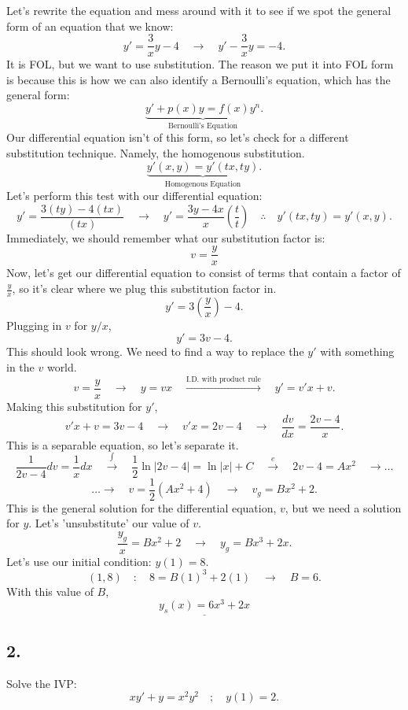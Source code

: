 \documentclass[a4paper,12pt]{article}
\begin{document}
Let's rewrite the equation and mess around with it to see if we spot the general form of an equation that we know:
$$ y' = \frac{3}{x}y - 4 \quad\rightarrow\quad y' - \frac{3}{x}y = -4. $$
It is FOL, but we want to use substitution. The reason we put it into FOL form is because this is how we can also identify a Bernoulli's equation, which has the general form:
$$ \underbrace{y' + p(x)y = f(x)y^{n}}_{\text{Bernoulli's Equation}}. $$
Our differential equation isn't of this form, so let's check for a different substitution technique. Namely, the homogenous substitution.
$$ \underbrace{y'(x, y) = y'(tx, ty)}_{\text{Homogenous Equation}}. $$
Let's perform this test with our differential equation:
$$ y' = \frac{3(ty) - 4(tx)}{(tx)} \quad\rightarrow\quad y' = \frac{3y-4x}{x} \left(\frac{t}{t}\right) \quad\therefore\quad y'(tx, ty)=y'(x,y). $$
Immediately, we should remember what our substitution factor is:
$$ \boxed{v=\frac{y}{x}} $$
Now, let's get our differential equation to consist of terms that contain a factor of $\frac{y}{x}$, so it's clear where we plug this substitution factor in.
$$ y' = 3\left(\frac{y}{x}\right) - 4. $$
Plugging in $v$ for $y/x$,
$$ y' = 3v -4. $$
This should look wrong. We need to find a way to replace the $y'$ with something in the $v$ world.
$$ v=\frac{y}{x} \quad\rightarrow\quad y = vx \quad\overset{\text{I.D. with product rule}}\rightarrow\quad y' = v'x + v. $$
Making this substitution for $y'$,
$$ v'x + v = 3v - 4 \quad\rightarrow\quad v'x = 2v-4 \quad\rightarrow\quad \frac{dv}{dx} = \frac{2v-4}{x}. $$
This is a separable equation, so let's separate it.
$$ \frac{1}{2v-4}dv = \frac{1}{x}dx \quad\overset{\int}\rightarrow\quad \frac{1}{2}\ln{|2v-4|} = \ln{|x|+C} \quad\overset{e}\rightarrow\quad 2v-4 = Ax^2 \quad\rightarrow\ldots$$
$$\ldots\rightarrow\quad v=\frac{1}{2}\left(Ax^2+4\right) \quad\rightarrow\quad v_g = Bx^2 + 2.  $$
This is the general solution for the differential equation, $v$, but we need a solution for $y$. Let's 'unsubstitute' our value of $v$.
$$ \frac{y_g}{x} = Bx^2 + 2 \quad\rightarrow\quad y_g = Bx^3 + 2x. $$
Let's use our initial condition: $y(1)=8.$
$$ (1,8)\quad:\quad 8 = B(1)^3 + 2(1) \quad\rightarrow\quad B = 6. $$
With this value of $B$,
$$ \underline{\boxed{y_s(x) = 6x^3 + 2x}} $$

\pagebreak

\subsection*{2.} 
Solve the IVP:
$$xy' + y = x^2y^2 \quad ; \quad y(1)=2.$$
\\
 
\end{document}
